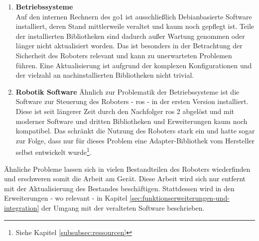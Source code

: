 \begin{enumerate}
    \item \textbf{Betriebssysteme}\\
    Auf den internen Rechnern des \gls{go1} ist ausschließlich Debianbasierte Software installiert, deren Stand mittlerweile
    veraltet und kaum noch gepflegt ist.
    Teile der installierten Bibliotheken sind dadurch außer Wartung genommen oder länger nicht aktualisiert worden.
    Das ist besonders in der Betrachtung der Sicherheit des Roboters relevant und kann zu unerwarteten Problemen führen.
    Eine Aktualisierung ist aufgrund der komplexen Konfigurationen und der vielzahl an nachinstallierten Bibliotheken nicht trivial.
    \item \textbf{Robotik Software}
    Ähnlich zur Problematik der Betriebssysteme ist die Software zur Steuerung des Roboters - \gls{ros} - in der ersten
    Version installiert.
    Diese ist seit längerer Zeit durch den Nachfolger \gls{ros} \num{2} abgelöst und mit moderner Software und dritten
    Bibliotheken und Erweiterungen kaum noch kompatibel.
    Das schränkt die Nutzung des Roboters stark ein und hatte sogar zur Folge, dass nur für dieses Problem eine Adapter-Bibliothek
    vom Hersteller selbst entwickelt wurde\footnote{Siehe Kapitel \ref{subsubsec:ressourcen}}.
\end{enumerate}

Ähnliche Probleme lassen sich in vielen Bestandteilen des Roboters wiederfinden und erschweren somit die Arbeit am
Gerät.
Diese Arbeit wird sich nur entfernt mit der Aktualisierung des Bestandes beschäftigen.
Stattdessen wird in den Erweiterungen - wo relevant - in Kapitel \ref{sec:funktionserweiterungen-und-integration} der Umgang mit der veralteten Software beschrieben.



